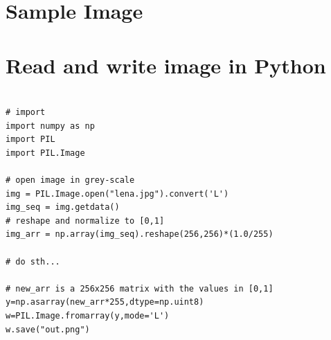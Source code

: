 \documentclass[10pt]{article}
\begin{document}
% 
% 

\newpage
\begin{appendices}

\section{Sample Image}\label{app:sample_img}

\begin{figure}[h]
   
\end{figure}



\section{Read and write image in Python}
\label{app:pil}

\begin{verbatim}

# import
import numpy as np
import PIL
import PIL.Image

# open image in grey-scale
img = PIL.Image.open("lena.jpg").convert('L')
img_seq = img.getdata()
# reshape and normalize to [0,1]
img_arr = np.array(img_seq).reshape(256,256)*(1.0/255)

# do sth...

# new_arr is a 256x256 matrix with the values in [0,1]
y=np.asarray(new_arr*255,dtype=np.uint8)
w=PIL.Image.fromarray(y,mode='L')
w.save("out.png")

\end{verbatim}


\end{appendices}
\end{document}
